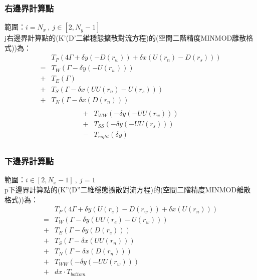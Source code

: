 \documentclass[12pt]{article}
\begin{document}
\subsubsection{右邊界計算點}
\noindent 範圍：$i = N_{x}\ ,\ j\in [2,N_{y}-1]$\\[1.5ex]
\noindent j右邊界計算點的(K'(D'二維穩態擴散對流方程)的(空間二階精度MINMOD離散格式))為：
\begin{equation}\begin{split}
&T_{P}(4\Gamma +\delta y(-D(r_w)) +\delta x(U(r_n)-D(r_s)))\\[1.5ex]
=&T_{W}(\Gamma -\delta y(-U(r_w)))\\[1.5ex]
+&T_{E}(\Gamma )\\[1.5ex]
+&T_{S}(\Gamma -\delta x(UU(r_n)-U(r_s)))\\[1.5ex]
+&T_{N}(\Gamma -\delta x(D(r_n)))\\[1.5ex]
\end{split}\end{equation}
\begin{equation}\begin{split}
+&T_{WW}(-\delta y(-UU(r_w)))\\[1.5ex]
+&T_{SS}(-\delta y(-UU(r_s)))\\[1.5ex]
-&T_{right}(\delta y)\\[1.5ex]
\end{split}\end{equation}
\subsubsection{下邊界計算點}
\noindent 範圍：$i \in [2,N_{x}-1]\ ,\ j = 1$\\[1.5ex]
\noindent p下邊界計算點的(K''(D''二維穩態擴散對流方程)的(空間二階精度MINMOD離散格式))為：
\begin{equation}\begin{split}
    &T_{P}(4\Gamma + \delta y (U(r_{e})- D(r_{w})) + \delta x (U(r_{n})))\\[1.5ex]
    =&T_{W}(\Gamma - \delta y (UU(r_{e}) - U(r_{w})))\\[1.5ex]
    +&T_{E}(\Gamma - \delta y (D(r_{e})))\\[1.5ex]
    +&T_{S}(\Gamma - \delta x (UU(r_{n})))\\[1.5ex]
    +&T_{N}(\Gamma - \delta x (D(r_{n})))\\[1.5ex]
    +&T_{WW}(-\delta y (-UU(r_{w})))\\[1.5ex] 
    +&dx\cdot T_{bottom}\\[1.5ex]
\end{split}\end{equation}
\end{document}
